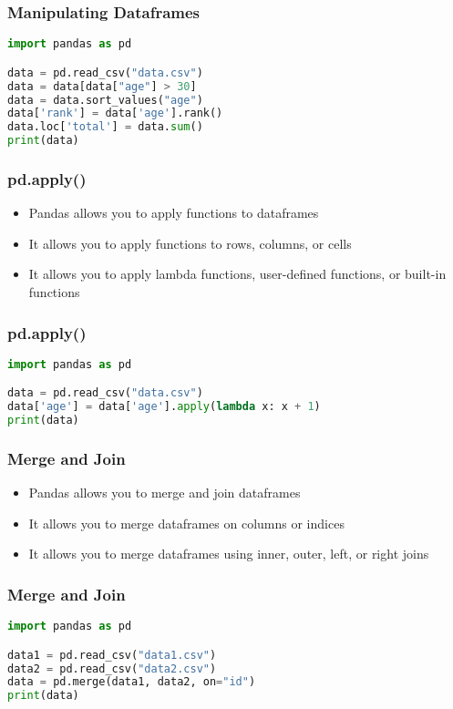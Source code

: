 \documentclass[serif, 9pt, aspectratio=32]{beamer}
\begin{document}
\begin{frame}[fragile]
    \frametitle{Manipulating Dataframes}
    \begin{lstlisting}[language=Python]
import pandas as pd

data = pd.read_csv("data.csv")
data = data[data["age"] > 30]
data = data.sort_values("age")
data['rank'] = data['age'].rank()
data.loc['total'] = data.sum()
print(data)
    \end{lstlisting}
\end{frame}

\begin{frame}
    \centering
    \frametitle{pd.apply()}
    \begin{itemize}
        \setlength{\itemsep}{2em}
        \item Pandas allows you to apply functions to dataframes
        \item It allows you to apply functions to rows, columns, or cells
        \item It allows you to apply lambda functions, user-defined functions, or built-in functions
    \end{itemize}
\end{frame}

\begin{frame}[fragile]
    \frametitle{pd.apply()}
    \begin{lstlisting}[language=Python]
import pandas as pd

data = pd.read_csv("data.csv")
data['age'] = data['age'].apply(lambda x: x + 1)
print(data)
    \end{lstlisting}
\end{frame}

\begin{frame}
    \centering
    \frametitle{Merge and Join}
    \begin{itemize}
        \setlength{\itemsep}{2em}
        \item Pandas allows you to merge and join dataframes
        \item It allows you to merge dataframes on columns or indices
        \item It allows you to merge dataframes using inner, outer, left, or right joins
    \end{itemize}
\end{frame}

\begin{frame}[fragile]
    \frametitle{Merge and Join}
    \begin{lstlisting}[language=Python]
import pandas as pd

data1 = pd.read_csv("data1.csv")
data2 = pd.read_csv("data2.csv")
data = pd.merge(data1, data2, on="id")
print(data)
    \end{lstlisting}
\end{frame}
\end{document}
